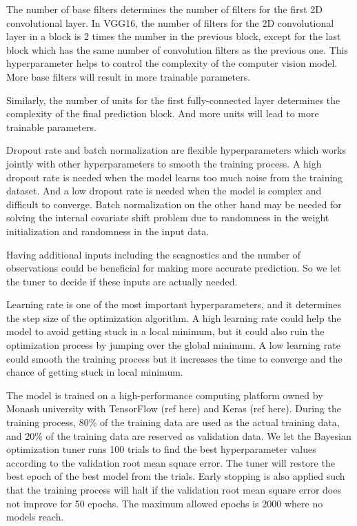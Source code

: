 \documentclass[]{interact}
\theoremstyle{plain}%
\theoremstyle{definition}
\theoremstyle{remark}
\begin{document}
The number of base filters determines the number of filters for the
first 2D convolutional layer. In VGG16, the number of filters for the 2D
convolutional layer in a block is 2 times the number in the previous
block, except for the last block which has the same number of
convolution filters as the previous one. This hyperparameter helps to
control the complexity of the computer vision model. More base filters
will result in more trainable parameters.

Similarly, the number of units for the first fully-connected layer
determines the complexity of the final prediction block. And more units
will lead to more trainable parameters.

Dropout rate and batch normalization are flexible hyperparameters which
works jointly with other hyperparameters to smooth the training process.
A high dropout rate is needed when the model learns too much noise from
the training dataset. And a low dropout rate is needed when the model is
complex and difficult to converge. Batch normalization on the other hand
may be needed for solving the internal covariate shift problem due to
randomness in the weight initialization and randomness in the input
data.

Having additional inputs including the scagnostics and the number of
observations could be beneficial for making more accurate prediction. So
we let the tuner to decide if these inputs are actually needed.

Learning rate is one of the most important hyperparameters, and it
determines the step size of the optimization algorithm. A high learning
rate could help the model to avoid getting stuck in a local minimum, but
it could also ruin the optimization process by jumping over the global
minimum. A low learning rate could smooth the training process but it
increases the time to converge and the chance of getting stuck in local
minimum.

The model is trained on a high-performance computing platform owned by
Monash university with TensorFlow (ref here) and Keras (ref here).
During the training process, 80\% of the training data are used as the
actual training data, and 20\% of the training data are reserved as
validation data. We let the Bayesian optimization tuner runs 100 trials
to find the best hyperparameter values according to the validation root
mean square error. The tuner will restore the best epoch of the best
model from the trials. Early stopping is also applied such that the
training process will halt if the validation root mean square error does
not improve for 50 epochs. The maximum allowed epochs is 2000 where no
models reach.
\end{document}
